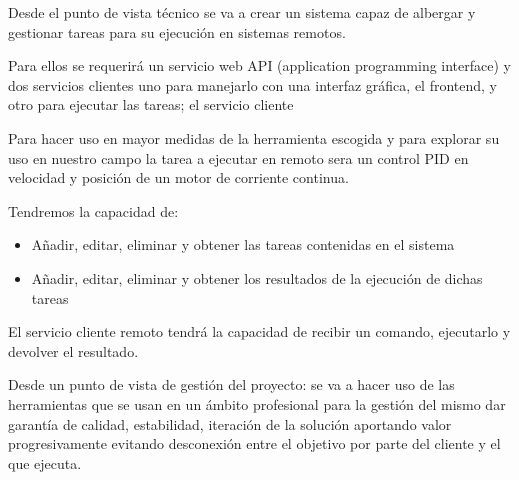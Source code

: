 
Desde el punto de vista técnico se va a crear un sistema capaz de albergar y gestionar tareas para su ejecución en sistemas remotos.

Para ellos se requerirá un servicio web API (application programming interface) y dos servicios clientes uno para manejarlo con una interfaz gráfica, el frontend, y otro para ejecutar las tareas; el servicio cliente

Para hacer uso en mayor medidas de la herramienta escogida y para explorar su uso en nuestro campo la tarea a ejecutar en remoto sera un control PID en velocidad y posición de un motor de corriente continua.

Tendremos la capacidad de:

\begin{itemize}
	\item Añadir, editar, eliminar y obtener las tareas contenidas en el sistema
	\item Añadir, editar, eliminar y obtener los resultados de la ejecución de dichas tareas
\end{itemize} 

El servicio cliente remoto tendrá la capacidad de recibir un comando, ejecutarlo y devolver el resultado.

Desde un punto de vista de gestión del proyecto: se va a hacer uso de las herramientas que se usan en un ámbito profesional para la gestión del mismo dar garantía de calidad, estabilidad, iteración de la solución aportando valor progresivamente evitando desconexión entre el objetivo por parte del cliente y el que ejecuta.